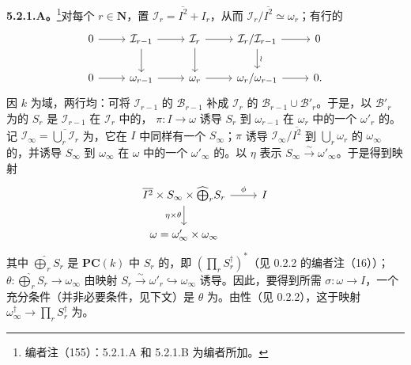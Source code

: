 \textbf{5.2.1.A。}\footnote{编者注（155）：5.2.1.A 和 5.2.1.B 为编者所加。}对每个 $r\in\mathbf N$，置 $\mathcal I_r=\overline{I^2}+I_r$，从而 $\mathcal I_r/\overline{I^2}\simeq\omega_r$；有行的
\[
\begin{tikzcd}
0\arrow[r]&\mathcal I_{r-1}\arrow[r]\arrow[d]&\mathcal I_r\arrow[r]\arrow[d]&\mathcal I_r/\mathcal I_{r-1}\arrow[r]\arrow[d,"\wr"]&0\\
0\arrow[r]&\omega_{r-1}\arrow[r]&\omega_r\arrow[r]&\omega_r/\omega_{r-1}\arrow[r]&0.
\end{tikzcd}
\]
因 $k$ 为域，两行均：可将 $\mathcal I_{r-1}$ 的 $\mathscr B_{r-1}$ 补成 $\mathcal I_r$ 的 $\mathscr B_{r-1}\cup\mathscr B'_r$。于是，以 $\mathscr B'_r$ 为的 $S_r$ 是 $\mathcal I_{r-1}$ 在 $\mathcal I_r$ 中的， $\pi:I\to\omega$ 诱导 $S_r$ 到 $\omega_{r-1}$ 在 $\omega_r$ 中的一个 $\omega'_r$ 的。记 $\mathcal I_\infty=\overline{\bigcup_r\mathcal I_r}$ 为，它在 $I$ 中同样有一个 $S_\infty$；$\pi$ 诱导 $\mathcal I_\infty/\overline{I^2}$ 到 $\bigcup_r\omega_r$ 的 $\omega_\infty$ 的，并诱导 $S_\infty$ 到 $\omega_\infty$ 在 $\omega$ 中的一个 $\omega'_\infty$ 的。以 $\eta$ 表示 $S_\infty\xrightarrow{\sim}\omega'_\infty$。于是得到映射
\[
\begin{tikzcd}
\overline{I^2}\times S_\infty\times\widehat{\bigoplus}_r S_r\arrow[r,"\phi"]\arrow[d,"\eta\times\theta"']&I\\
\omega=\omega'_\infty\times\omega_\infty&
\end{tikzcd}
\]
其中 $\widehat{\bigoplus}_rS_r$ 是 $\mathbf{PC}(k)$ 中 $S_r$ 的，即 $(\prod_rS_r^\dagger)^*$（见 0.2.2 的编者注（16））；$\theta:\widehat{\bigoplus}_rS_r\to\omega_\infty$ 由映射 $S_r\xrightarrow{\sim}\omega'_r\hookrightarrow\omega_\infty$ 诱导。因此，要得到所需 $\sigma:\omega\to I$，一个充分条件（并非必要条件，见下文）是 $\theta$ 为。由性（见 0.2.2），这于映射 $\omega_\infty^\dagger\to\prod_rS_r^\dagger$ 为。

